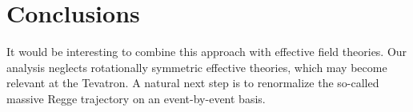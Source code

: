 \section{Conclusions}\label{sec:conclusions}

It would be interesting to combine this approach with effective field
theories. Our analysis neglects rotationally symmetric effective
theories, which may become relevant at the Tevatron. A natural next step
is to renormalize the so-called massive Regge trajectory on an
event-by-event basis.

